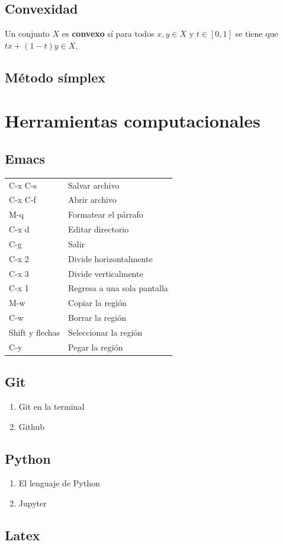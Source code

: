 \documentclass[11pt]{article}
\begin{document}
\subsection{Convexidad}
\label{sec:org9ae293c}

Un conjunto \(X\) es \textbf{convexo} sí para todos \(x,y\in X\) y \(t\in
   [0,1]\) se tiene que \(tx+(1-t)y\in X\).

\subsection{Método símplex}
\label{sec:orgca4fe21}

\section{Herramientas computacionales}
\label{sec:org397b552}
\subsection{Emacs}
\label{sec:orgf100d32}

\begin{center}
\begin{tabular}{ll}
C-x C-s & Salvar archivo\\
C-x C-f & Abrir archivo\\
M-q & Formatear el párrafo\\
C-x d & Editar directorio\\
C-g & Salir\\
C-x 2 & Divide horizontalmente\\
C-x 3 & Divide verticalmente\\
C-x 1 & Regresa a una sola pantalla\\
M-w & Copiar la región\\
C-w & Borrar la región\\
Shift y flechas & Seleccionar la región\\
C-y & Pegar la región\\
\end{tabular}
\end{center}

\subsection{Git}
\label{sec:org843cc13}
\begin{enumerate}
\item Git en la terminal
\label{sec:org8522778}
\item Github
\label{sec:orgc929355}
\end{enumerate}
\subsection{Python}
\label{sec:orgf7d7bf8}
\begin{enumerate}
\item El lenguaje de Python
\label{sec:org469c134}
\item Jupyter
\label{sec:org73dd99c}
\end{enumerate}
\subsection{Latex}
\label{sec:orged60103}
\end{document}
